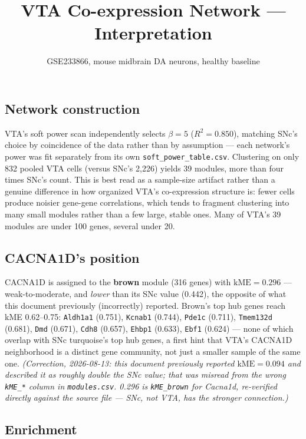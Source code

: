\documentclass[11pt]{article}
\title{VTA Co-expression Network --- Interpretation}
\author{GSE233866, mouse midbrain DA neurons, healthy baseline}
\date{}
\begin{document}
\maketitle

\subsection*{Network construction}

VTA's soft power scan independently selects $\beta=5$ ($R^2=0.850$), matching
SNc's choice by coincidence of the data rather than by assumption --- each
network's power was fit separately from its own \texttt{soft\_power\_table.csv}.
Clustering on only 832 pooled VTA cells (versus SNc's 2{,}226) yields 39
modules, more than four times SNc's count. This is best read as a
sample-size artifact rather than a genuine difference in how organized
VTA's co-expression structure is: fewer cells produce noisier gene-gene
correlations, which tends to fragment clustering into many small modules
rather than a few large, stable ones. Many of VTA's 39 modules are under
100 genes, several under 20.

\subsection*{CACNA1D's position}

CACNA1D is assigned to the \textbf{brown} module (316 genes) with
$\mathrm{kME}=0.296$ --- weak-to-moderate, and \emph{lower} than its SNc
value (0.442), the opposite of what this document previously (incorrectly)
reported. Brown's top hub genes reach kME 0.62--0.75:
\texttt{Aldh1a1} (0.751), \texttt{Kcnab1} (0.744), \texttt{Pde1c} (0.711),
\texttt{Tmem132d} (0.681), \texttt{Dmd} (0.671), \texttt{Cdh8} (0.657),
\texttt{Ehbp1} (0.633), \texttt{Ebf1} (0.624) --- none of which overlap
with SNc turquoise's top hub genes, a first hint that VTA's CACNA1D
neighborhood is a distinct gene community, not just a smaller sample of
the same one. \emph{(Correction, 2026-08-13: this document previously
reported $\mathrm{kME}=0.094$ and described it as roughly double the SNc
value; that was misread from the wrong \texttt{kME\_*} column in
\texttt{modules.csv}. 0.296 is \texttt{kME\_brown} for Cacna1d,
re-verified directly against the source file --- SNc, not VTA, has the
stronger connection.)}

\subsection*{Enrichment}
\end{document}
